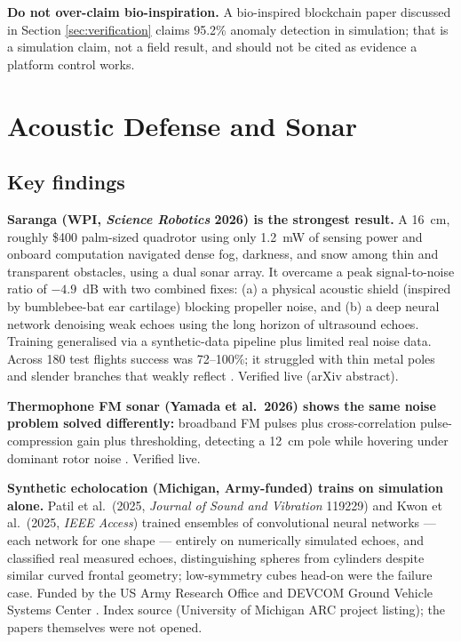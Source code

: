 \documentclass[11pt]{article}
\begin{document}
\textbf{Do not over-claim bio-inspiration.} A bio-inspired blockchain
paper discussed in Section \ref{sec:verification} claims 95.2\%
anomaly detection in simulation; that is a simulation claim, not a
field result, and should not be cited as evidence a platform control
works.

\section{Acoustic Defense and Sonar}
\label{sec:acoustic}

\subsection{Key findings}

\textbf{Saranga (WPI, \emph{Science Robotics} 2026) is the strongest
result.} A 16~cm, roughly \$400 palm-sized quadrotor using only 1.2~mW
of sensing power and onboard computation navigated dense fog, darkness,
and snow among thin and transparent obstacles, using a dual sonar array.
It overcame a peak signal-to-noise ratio of $-4.9$~dB with two combined
fixes: (a) a physical acoustic shield (inspired by bumblebee-bat ear
cartilage) blocking propeller noise, and (b) a deep neural network
denoising weak echoes using the long horizon of ultrasound echoes.
Training generalised via a synthetic-data pipeline plus limited real
noise data. Across 180 test flights success was 72--100\%; it struggled
with thin metal poles and slender branches that weakly reflect
\cite{saranga2026}. Verified live (arXiv abstract).

\textbf{Thermophone FM sonar (Yamada et al.\ 2026) shows the same noise
problem solved differently:} broadband FM pulses plus
cross-correlation pulse-compression gain plus thresholding, detecting a
12~cm pole while hovering under dominant rotor noise
\cite{yamada2026}. Verified live.

\textbf{Synthetic echolocation (Michigan, Army-funded) trains on
simulation alone.} Patil et al.\ (2025, \emph{Journal of Sound and
Vibration} 119229) and Kwon et al.\ (2025, \emph{IEEE Access}) trained
ensembles of convolutional neural networks --- each network for one
shape --- entirely on numerically simulated echoes, and classified real
measured echoes, distinguishing spheres from cylinders despite similar
curved frontal geometry; low-symmetry cubes head-on were the failure
case. Funded by the US Army Research Office and DEVCOM Ground Vehicle
Systems Center \cite{michigan2025}. Index source (University of
Michigan ARC project listing); the papers themselves were not opened.
\end{document}
